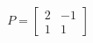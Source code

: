 \documentclass[preview]{standalone}
\begin{document}
\begin{align*}
P = \begin{bmatrix} 2 & -1 \\ 1 & 1 \end{bmatrix}
\end{align*}
\end{document}
